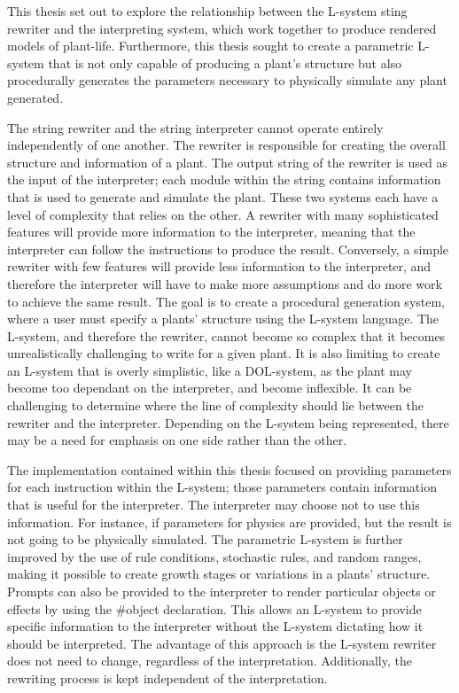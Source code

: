 This thesis set out to explore the relationship between the L-system sting rewriter and the interpreting system, which work together to produce rendered models of plant-life. Furthermore, this thesis sought to create a parametric L-system that is not only capable of producing a plant's structure but also procedurally generates the parameters necessary to physically simulate any plant generated.  

The string rewriter and the string interpreter cannot operate entirely independently of one another. The rewriter is responsible for creating the overall structure and information of a plant. The output string of the rewriter is used as the input of the interpreter; each module within the string contains information that is used to generate and simulate the plant. These two systems each have a level of complexity that relies on the other. A rewriter with many sophisticated features will provide more information to the interpreter, meaning that the interpreter can follow the instructions to produce the result. Conversely, a simple rewriter with few features will provide less information to the interpreter, and therefore the interpreter will have to make more assumptions and do more work to achieve the same result. The goal is to create a procedural generation system, where a user must specify a plants' structure using the L-system language. The L-system, and therefore the rewriter, cannot become so complex that it becomes unrealistically challenging to write for a given plant. It is also limiting to create an L-system that is overly simplistic, like a DOL-system, as the plant may become too dependant on the interpreter, and become inflexible. It can be challenging to determine where the line of complexity should lie between the rewriter and the interpreter. Depending on the L-system being represented, there may be a need for emphasis on one side rather than the other.

The implementation contained within this thesis focused on providing parameters for each instruction within the L-system; those parameters contain information that is useful for the interpreter. The interpreter may choose not to use this information. For instance, if parameters for physics are provided, but the result is not going to be physically simulated. The parametric L-system is further improved by the use of rule conditions, stochastic rules, and random ranges, making it possible to create growth stages or variations in a plants' structure. Prompts can also be provided to the interpreter to render particular objects or effects by using the \#object declaration. This allows an L-system to provide specific information to the interpreter without the L-system dictating how it should be interpreted. The advantage of this approach is the L-system rewriter does not need to change, regardless of the interpretation. Additionally, the rewriting process is kept independent of the interpretation.

